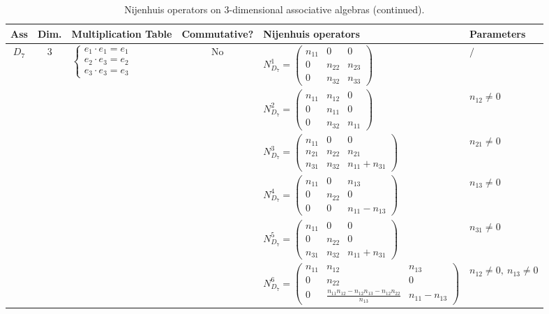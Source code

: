 \documentclass[12pt, reqno]{amsart}
\theoremstyle{plain}
\begin{document}
\begin{table}[H]
    \centering
    \tiny
    \caption{Nijenhuis operators on 3-dimensional associative algebras (continued).}
    \setlength{\tabcolsep}{1.5pt}
    \begin{tabular}{|c|c|l|c|l|l|}
    \hline
    \textbf{Ass} & \textbf{Dim.} & \textbf{Multiplication Table} & \textbf{Commutative?} & \textbf{Nijenhuis operators} & \textbf{Parameters} \\
    \hline
    \multirow{6}{*}{$D_7$} & \multirow{6}{*}{3} & \multirow{6}{*}{$\begin{cases} e_1 \cdot e_1 = e_1 \\ e_2 \cdot e_3 = e_2 \\ e_3 \cdot e_3 = e_3 \end{cases}$} & \multirow{6}{*}{No} & 
    $N_{D_7}^1 = \begin{pmatrix} n_{11} & 0 & 0 \\ 0 & n_{22} & n_{23} \\ 0 & n_{32} & n_{33} \end{pmatrix}$ & $/$ \\
    & & & & $N_{D_7}^2 = \begin{pmatrix} n_{11} & n_{12} & 0 \\ 0 & n_{11} & 0 \\ 0 & n_{32} & n_{11} \end{pmatrix}$ & $n_{12} \neq 0$ \\
    & & & & $N_{D_7}^3 = \begin{pmatrix} n_{11} & 0 & 0 \\ n_{21} & n_{22} & n_{21} \\ n_{31} & n_{32} & n_{11}+n_{31} \end{pmatrix}$ & $n_{21} \neq 0$ \\
    & & & & $N_{D_7}^4 = \begin{pmatrix} n_{11} & 0 & n_{13} \\ 0 & n_{22} & 0 \\ 0 & 0 & n_{11}-n_{13} \end{pmatrix}$ & $n_{13} \neq 0$ \\
    & & & & $N_{D_7}^5 = \begin{pmatrix} n_{11} & 0 & 0 \\ 0 & n_{22} & 0 \\ n_{31} & n_{32} & n_{11}+n_{31} \end{pmatrix}$ & $n_{31} \neq 0$ \\
    & & & & $N_{D_7}^6 = \begin{pmatrix} n_{11} & n_{12} & n_{13} \\ 0 & n_{22} & 0 \\ 0 & \frac{n_{11}n_{12}-n_{12}n_{13}-n_{12}n_{22}}{n_{13}} & n_{11}-n_{13} \end{pmatrix}$ & $n_{12} \neq 0,\ n_{13} \neq 0$ \\

\end{tabular}
\end{table}
\end{document}
